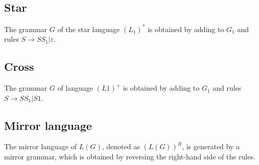 \subsection*{Star}
The grammar $G$ of the star language $(L_1)^{*}$ is obtained by adding to $G_1$ and rules $S \rightarrow SS_1|\varepsilon$.

\subsection*{Cross}
The grammar $G$ of language $(L1)^{+}$ is obtained by adding to $G_1$ and rules $S \rightarrow SS_1|S1$. 

\subsection*{Mirror language}
The mirror language of $L(G)$, denoted as $(L(G))^R$, is generated by a mirror grammar, which is obtained by reversing the right-hand side of the rules.
